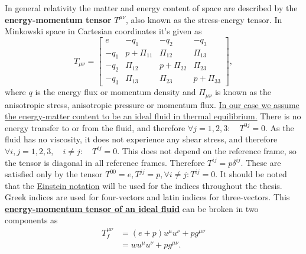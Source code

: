 In general relativity the matter and energy content of space are described by the \textbf{energy-momentum tensor} $T^{\mu \nu}$, also known as the stress-energy tensor.
In Minkowski space in Cartesian coordinates it's given as
\cites[eq. 4.17]{rasanen_gr_2022}[fig. 3.3]{rezzolla_relativistic_2013}
\begin{equation}
T_{\mu \nu} =
\begin{bmatrix}
e & -q_1 & -q_2 & -q_3 \\
-q_1 & p + \Pi_{11} & \Pi_{12} & \Pi_{13} \\
-q_2 & \Pi_{12} & p + \Pi_{22} & \Pi_{23} \\
-q_3 & \Pi_{13} & \Pi_{23} & p + \Pi_{33}
\end{bmatrix},
\end{equation}
where $q$ is the energy flux or momentum density and $\Pi_{\mu \nu}$ is known as the anisotropic stress, anisotropic pressure or momentum flux.
\href{https://physics.stackexchange.com/a/412067/298623}{In our case we assume the energy-matter content to be an ideal fluid in thermal equilibrium.}
There is no energy transfer to or from the fluid, and therefore
$\forall j=1,2,3: \quad T^{0j} = 0$.
As the fluid has no viscosity, it does not experience any shear stress, and therefore
$\forall i,j=1,2,3, \quad i \neq j: \quad T^{ij} = 0$.
This does not depend on the reference frame, so the tensor is diagonal in all reference frames.
Therefore $T^{ij} = p \delta^{ij}$.
These are satisfied only by the tensor $T^{00}=e, T^{jj}=p, \forall i \neq j: T^{ij}=0$.
It should be noted that the
\href{https://en.wikipedia.org/wiki/Einstein_notation}{Einstein notation} will be used for the indices throughout the thesis.
Greek indices are used for four-vectors and latin indices for three-vectors.
This
\href{https://en.wikipedia.org/wiki/Stress\%E2\%80\%93energy\_tensor\#Stress\%E2\%80\%93energy\_of\_a\_fluid\_in\_equilibrium}{\textbf{energy-momentum tensor of an ideal fluid}}
can be broken in two components as
\cites[eq. 5.11, 5.23]{lecture_notes}[eq. 4.12]{rasanen_gr_2022}
\begin{align}
T^{\mu \nu}_f
&= (e+p) u^\mu u^\nu + p g^{\mu \nu}
\label{eq:ep_tensor} \\
&= w u^\mu u^\nu + p g^{\mu \nu}.
\end{align}

